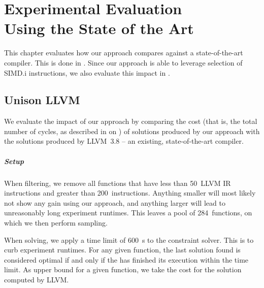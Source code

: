 %

\chapter[Experimental Evaluation Using the State of the Art]%
        {Experimental Evaluation\\ Using the State of the Art}

This chapter evaluates how our approach compares against a state-of-the-art
\gls{compiler}.
%
This is done in .
%
Since our approach is able to leverage selection of \gls{SIMD.i}
\glspl{instruction}, we also evaluate this impact in
.


\section{Unison \versus LLVM}

We evaluate the impact of our approach by comparing the cost (that is, the total
number of cycles, as described in  on
) of \glspl{solution} produced by our
approach with the \glspl{solution} produced by \mbox{\gls{LLVM} 3.8} -- an
existing, state-of-the-art \gls{compiler}.


\paragraph{Setup}

When filtering, we remove all \glspl{function} that have less than
\num{50}~\gls{LLVM} \gls{IR} \glspl{instruction} and greater than
\num{200}~\glspl{instruction}.
%
Anything smaller will most likely not show any gain using our approach, and
anything larger will lead to unreasonably long experiment runtimes.
%
This leaves a pool of \num{284}~\glspl{function}, on which we then perform
sampling.

When solving, we apply a time limit of \SI{600}{\s} to the \gls{constraint
  solver}.
%
This is to curb experiment runtimes.
%
For any given \gls{function}, the last \gls{solution} found is considered
optimal if and only if the  has finished its
execution within the time limit.
%
As upper bound for a given \gls{function}, we take the cost for the
\gls{solution} computed by \gls{LLVM}.


